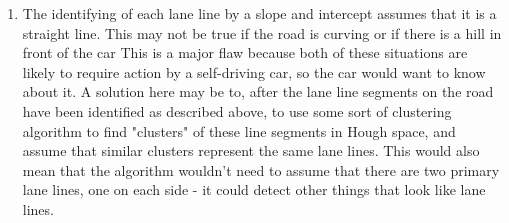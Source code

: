 \documentclass{article}
\begin{document}
\begin{enumerate}
\item The identifying of each lane line by a slope and intercept assumes that it is a straight line. This may not be true if the road is curving or if there is a hill in front of the car This is a major flaw because both of these situations are likely to require action by a self-driving car, so the car would want to know about it. A solution here may be to, after the lane line segments on the road have been identified as described above, to use some sort of clustering algorithm to find "clusters" of these line segments in Hough space, and assume that similar clusters represent the same lane lines. This would also mean that the algorithm wouldn't need to assume that there are two primary lane lines, one on each side - it could detect other things that look like lane lines.
\end{enumerate}
\end{document}
